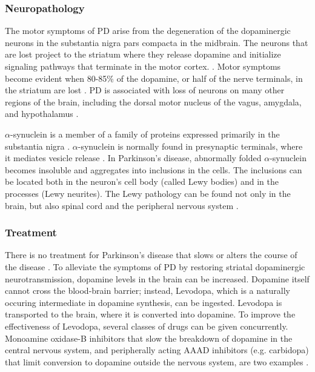 \subsubsection{Neuropathology}
The motor symptoms of PD arise from the degeneration of the dopaminergic neurons in the substantia nigra pars compacta in the midbrain. The neurons that are lost project to the striatum where they release dopamine and initialize signaling pathways that terminate in the motor cortex. \cite{LeWitt2008}. Motor symptoms become evident when 80-85\% of the dopamine, or half of the nerve terminals, in the striatum are lost \cite{Wirdefeldt2011,LeWitt2008}. PD is associated with loss of neurons on many other regions of the brain, including the dorsal motor nucleus of the vagus, amygdala, and hypothalamus \cite{Kalia2015}. \par 

$\alpha$-synuclein is a member of a family of proteins expressed primarily in the substantia nigra \cite{Porth2015}. $\alpha$-synuclein is normally found in presynaptic terminals, where it mediates vesicle release \cite{Dickson2018}. In Parkinson's disease, abnormally folded $\alpha$-synuclein becomes insoluble and aggregates into inclusions in the cells. The inclusions can be located both in the neuron's cell body (called Lewy bodies) and in the processes (Lewy neurites). The Lewy pathology can be found not only in the brain, but also spinal cord and the peripheral nervous system \cite{Kalia2015}.






\subsubsection{Treatment}
There is no treatment for Parkinson's disease that slows or alters the course of the disease \cite{Kalia2015}. %
To alleviate the symptoms of PD by restoring striatal dopaminergic neurotransmission, dopamine levels in the brain can be increased. Dopamine itself cannot cross the blood-brain barrier; instead, Levodopa, which is a naturally occuring intermediate in dopamine synthesis, can be ingested. Levodopa is transported to the brain, where it is converted into dopamine. 
To improve the effectiveness of Levodopa, several classes of drugs can be given concurrently. Monoamine oxidase-B inhibitors that slow the breakdown of dopamine in the central nervous system, and peripherally acting AAAD inhibitors (e.g. carbidopa) that limit conversion to dopamine outside the nervous system, are two examples \cite{LeWitt2008}. 


